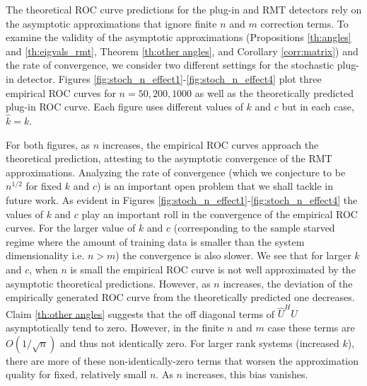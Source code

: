 \begin{figure}[t]
\vspace{-0.3in}
\end{figure}

The theoretical ROC curve predictions for the plug-in and RMT detectors rely on the asymptotic approximations that ignore finite $n$ and $m$ correction terms. To examine the validity of the asymptotic approximations (Propositions \ref{th:angles} and \ref{th:eigvals_rmt}, Theorem \ref{th:other angles}, and Corollary \ref{corr:matrix}) and the rate of convergence, we consider two different settings for the stochastic plug-in detector. Figures \ref{fig:stoch_n_effect1}-\ref{fig:stoch_n_effect4} plot three empirical ROC curves for $n=50,200,1000$ as well as the theoretically predicted plug-in ROC curve. Each figure uses different values of $k$ and $c$ but in each case, $\widehat{k}=k$.

For both figures, as $n$ increases, the empirical ROC curves approach the theoretical prediction, attesting to the asymptotic convergence of the RMT approximations. Analyzing the rate of convergence (which we conjecture to be $n^{1/2}$ for fixed $k$ and $c$) is an important open problem that we shall tackle in future work. As evident in Figures \ref{fig:stoch_n_effect1}-\ref{fig:stoch_n_effect4} the values of $k$ and $c$ play an important roll in the convergence of the empirical ROC curves. For the larger value of $k$ and $c$ (corresponding to the sample starved regime where the amount of training data is smaller than the system dimensionality i.e. $n>m$) the convergence is also slower. We see that for larger $k$ and $c$, when $n$ is small the empirical ROC curve is not well approximated by the asymptotic theoretical predictions. However, as $n$ increases, the deviation of the empirically generated ROC curve from the theoretically predicted one decreases. Claim \ref{th:other angles} suggests that the off diagonal terms of $\widehat{U}^HU$ asymptotically tend to zero. However, in the finite $n$ and $m$ case these terms are $O(1/\sqrt{n})$ and thus not identically zero. For larger rank systems (increased $k$), there are more of these non-identically-zero terms that worsen the approximation quality for fixed, relatively small $n$. As $n$ increases, this bias vanishes.

